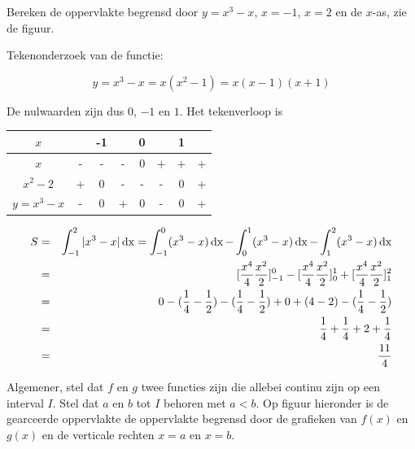 \begin{voorbeeld}
Bereken de oppervlakte begrensd door $y=x^3-x$, $x=-1$, $x=2$ en de $x$-as, zie de figuur.


\begin{center}
	
\end{center}

Tekenonderzoek van de functie:

\begin{equation*}
y=x^3-x=x(x^2-1)=x(x-1)(x+1)
\end{equation*}

De nulwaarden zijn dus $0$, $-1$ en $1$. Het tekenverloop is
\begin{center}
	\begin{tabular}{c|ccccccc}
	$x$ & & -1 & & 0 & & 1 & \\
	\hline
	$x$ & - & - & -& 0 & + & + & + \\
	$x^2-2$ & + & 0 & -& - & - & 0 & + \\
	\hline 
	$y=x^3-x$ & - & 0 & +& 0 & - & 0 & + 
	\end{tabular}
\end{center}

\begin{eqnarray*}
S &=& \int_{-1}^{2}|x^3-x|\operatorname{dx} = \int_{-1}^{0}(x^3-x)\operatorname{dx} - \int_{0}^{1}(x^3-x)\operatorname{dx} - \int_{1}^{2}(x^3-x)\operatorname{dx} \\
&=& [\frac{x^4}{4}\frac{x^2}{2}]_{-1}^{0} - [\frac{x^4}{4}\frac{x^2}{2}]_{0}^{1} + [\frac{x^4}{4}\frac{x^2}{2}]_{1}^{2} \\
&=& 0 - (\frac{1}{4}-\frac{1}{2}) - (\frac{1}{4}-\frac{1}{2}) + 0 + (4-2) - (\frac{1}{4}-\frac{1}{2}) \\
&=& \frac{1}{4} + \frac{1}{4} + 2 + \frac{1}{4} \\
&=& \frac{11}{4}
\end{eqnarray*}

\end{voorbeeld}

Algemener, stel dat $f$ en $g$ twee functies zijn die allebei continu zijn op een interval $I$. Stel dat $a$ en $b$ tot $I$ behoren met $a<b$. Op figuur hieronder is de gearceerde oppervlakte de oppervlakte begrensd door de grafieken van $f(x)$ en $g(x)$ en de verticale rechten $x=a$ en $x=b$.



